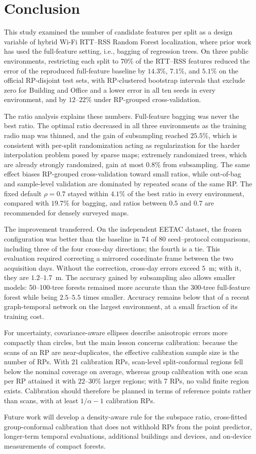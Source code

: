 \section{Conclusion}
\label{sec:conclusion}

This study examined the number of candidate features per split as a design variable of hybrid Wi-Fi RTT--RSS Random Forest localization, where prior work has used the full-feature setting, i.e., bagging of regression trees. On three public environments, restricting each split to $70\%$ of the RTT--RSS features reduced the error of the reproduced full-feature baseline by $14.3\%$, $7.1\%$, and $5.1\%$ on the official RP-disjoint test sets, with RP-clustered bootstrap intervals that exclude zero for Building and Office and a lower error in all ten seeds in every environment, and by $12$--$22\%$ under RP-grouped cross-validation.

The ratio analysis explains these numbers. Full-feature bagging was never the best ratio. The optimal ratio decreased in all three environments as the training radio map was thinned, and the gain of subsampling reached $25.5\%$, which is consistent with per-split randomization acting as regularization for the harder interpolation problem posed by sparse maps; extremely randomized trees, which are already strongly randomized, gain at most $0.8\%$ from subsampling. The same effect biases RP-grouped cross-validation toward small ratios, while out-of-bag and sample-level validation are dominated by repeated scans of the same RP. The fixed default $\rho=0.7$ stayed within $4.1\%$ of the best ratio in every environment, compared with $19.7\%$ for bagging, and ratios between $0.5$ and $0.7$ are recommended for densely surveyed maps.

The improvement transferred. On the independent EETAC dataset, the frozen configuration was better than the baseline in 74 of 80 seed--protocol comparisons, including three of the four cross-day directions; the fourth is a tie. This evaluation required correcting a mirrored coordinate frame between the two acquisition days. Without the correction, cross-day errors exceed $5$~m; with it, they are $1.2$--$1.7$~m. The accuracy gained by subsampling also allows smaller models: 50--100-tree forests remained more accurate than the 300-tree full-feature forest while being $2.5$--$5.5$ times smaller. Accuracy remains below that of a recent graph-temporal network on the largest environment, at a small fraction of its training cost.

For uncertainty, covariance-aware ellipses describe anisotropic errors more compactly than circles, but the main lesson concerns calibration: because the scans of an RP are near-duplicates, the effective calibration sample size is the number of RPs. With 21 calibration RPs, scan-level split-conformal regions fell below the nominal coverage on average, whereas group calibration with one scan per RP attained it with $22$--$30\%$ larger regions; with 7 RPs, no valid finite region exists. Calibration should therefore be planned in terms of reference points rather than scans, with at least $1/\alpha-1$ calibration RPs.

Future work will develop a density-aware rule for the subspace ratio, cross-fitted group-conformal calibration that does not withhold RPs from the point predictor, longer-term temporal evaluations, additional buildings and devices, and on-device measurements of compact forests.
